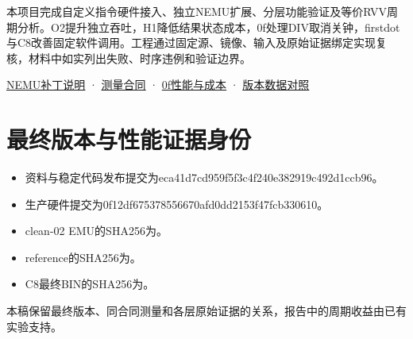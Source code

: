 本项目完成自定义指令硬件接入、独立NEMU扩展、分层功能验证及等价RVV周期分析。O2提升独立吞吐，H1降低结果状态成本，0f处理DIV取消关钟，firstdot与C8改善固定软件调用。工程通过固定源、镜像、输入及原始证据绑定实现复核，材料中如实列出失败、时序违例和验证边界。\par


\href{https://github.com/cc77-builder/riscv/blob/eca41d7cd959f5f3c4f240e382919c492d1ccb96/team/patches/nemu/README.md}{NEMU补丁说明} · \href{https://github.com/cc77-builder/riscv/blob/eca41d7cd959f5f3c4f240e382919c492d1ccb96/team/spec/measurement.md}{测量合同} · \href{https://github.com/cc77-builder/riscv/blob/eca41d7cd959f5f3c4f240e382919c492d1ccb96/team/optimizations/o2/r3-div-gate/PERFORMANCE\_COST\_RESULT.md}{0f性能与成本} · \href{https://github.com/cc77-builder/riscv/blob/eca41d7cd959f5f3c4f240e382919c492d1ccb96/team/docs/version-comparison-r5-g5-20261027.md}{版本数据对照}\par
\section{最终版本与性能证据身份}
\begin{itemize}
\item 资料与稳定代码发布提交为eca41d7cd959f5f3c4f240e382919c492d1ccb96。
\item 生产硬件提交为0f12df675378556670afd0dd2153f47fcb330610。
\item clean-02 EMU的SHA256为。
\item reference的SHA256为。
\item C8最终BIN的SHA256为。
\end{itemize}
本稿保留最终版本、同合同测量和各层原始证据的关系，报告中的周期收益由已有实验支持。
